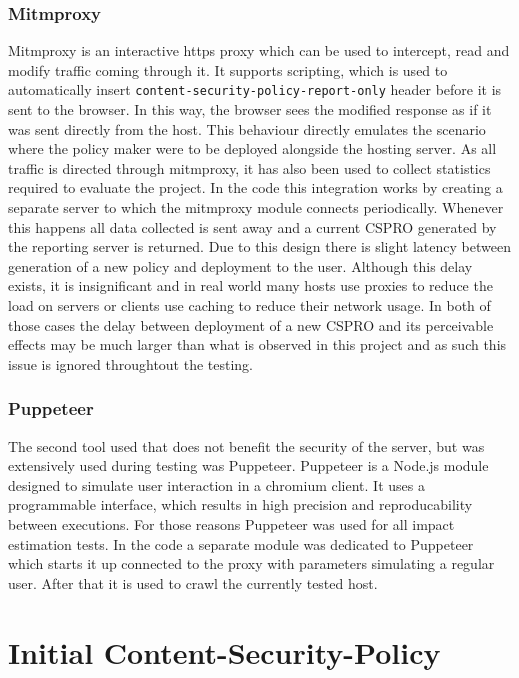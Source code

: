 \begin{description}
\subsubsection{Mitmproxy}
Mitmproxy is an interactive https proxy which can be used to intercept, read and modify traffic coming through it.
It supports scripting, which is used to automatically insert \texttt{content-security-policy-report-only} header before it is sent to the browser.
In this way, the browser sees the modified response as if it was sent directly from the host.
This behaviour directly emulates the scenario where the policy maker were to be deployed alongside the hosting server.
As all traffic is directed through mitmproxy, it has also been used to collect statistics required to evaluate the project.
In the code this integration works by creating a separate server to which the mitmproxy module connects periodically.
Whenever this happens all data collected is sent away and a current CSPRO generated by the reporting server is returned.
Due to this design there is slight latency between generation of a new policy and deployment to the user.
Although this delay exists, it is insignificant and in real world many hosts use proxies to reduce the load on servers or clients use caching to reduce their network usage.
In both of those cases the delay between deployment of a new CSPRO and its perceivable effects may be much larger than what is observed in this project and as such this issue is ignored throughtout the testing.

\subsubsection{Puppeteer}
The second tool used that does not benefit the security of the server, but was extensively used during testing was Puppeteer.
Puppeteer is a Node.js module designed to simulate user interaction in a chromium client.
It uses a programmable interface, which results in high precision and reproducability between executions.
For those reasons Puppeteer was used for all impact estimation tests.
In the code a separate module was dedicated to Puppeteer which starts it up connected to the proxy with parameters simulating a regular user.
After that it is used to crawl the currently tested host.


\section{Initial Content-Security-Policy}


\end{description}
